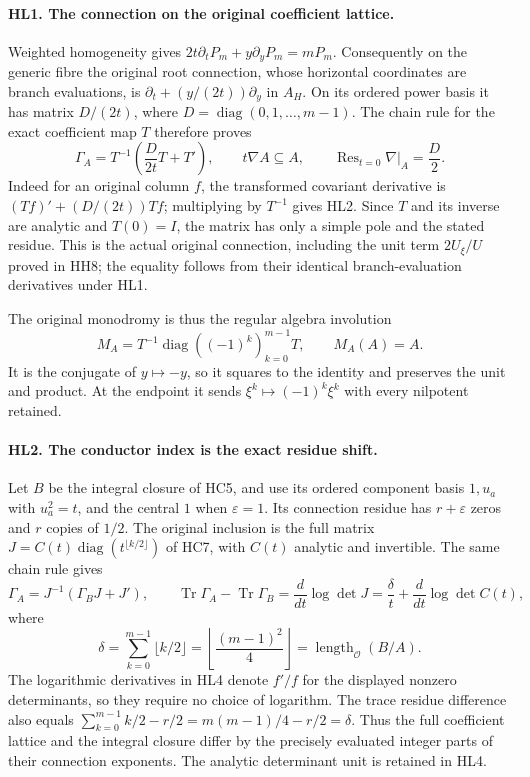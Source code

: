 \documentclass[11pt,a4paper]{article}
\theoremstyle{definition}\newtheorem{definition}[theorem]{Definition}
\begin{document}
\paragraph{HL1. The connection on the original coefficient lattice.}
Weighted homogeneity gives
$2t\partial_tP_m+y\partial_yP_m=mP_m$.
Consequently on the generic fibre the original root connection,
whose horizontal coordinates are branch evaluations, is
$\partial_t+(y/(2t))\partial_y$ in $A_H$.
On its ordered power basis it has matrix
$D/(2t)$, where $D=\operatorname{diag}(0,1,\ldots,m-1)$.
The chain rule for the exact coefficient map $T$ therefore proves
\[
 \Gamma_A=T^{-1}\left(\frac{D}{2t}T+T'\right),
 \qquad t\nabla A\subseteq A,
 \qquad \operatorname{Res}_{t=0}\nabla\big|_A=\frac D2.
 \tag{HL2}
\]
Indeed for an original column $f$, the transformed covariant
derivative is $(Tf)'+(D/(2t))Tf$; multiplying by $T^{-1}$ gives
HL2. Since $T$ and its inverse are analytic and $T(0)=I$, the
matrix has only a simple pole and the stated residue.
This is the actual original connection, including the unit term
$2U_\xi/U$ proved in HH8; the equality follows from their identical
branch-evaluation derivatives under HL1.

The original monodromy is thus the regular algebra involution
\[
 M_A=T^{-1}\operatorname{diag}((-1)^k)_{k=0}^{m-1}T,
       \qquad M_A(A)=A.
 \tag{HL3}
\]
It is the conjugate of $y\mapsto-y$, so it squares to the identity
and preserves the unit and product. At the endpoint it sends
$\xi^k\mapsto(-1)^k\xi^k$ with every nilpotent retained.

\paragraph{HL2. The conductor index is the exact residue shift.}
Let $B$ be the integral closure of HC5, and use its ordered
component basis $1,u_a$ with $u_a^2=t$, and the central $1$ when
$\varepsilon=1$. Its connection residue has $r+\varepsilon$
zeros and $r$ copies of $1/2$. The original inclusion is the full
matrix $J=C(t)\operatorname{diag}(t^{\lfloor k/2\rfloor})$ of HC7,
with $C(t)$ analytic and invertible. The same chain rule gives
\[
 \Gamma_A=J^{-1}(\Gamma_BJ+J'),\qquad
 \operatorname{Tr}\Gamma_A-\operatorname{Tr}\Gamma_B
    =\frac d{dt}\log\det J
    =\frac{\delta}{t}+\frac d{dt}\log\det C(t),
 \tag{HL4}
\]
where
\[
 \delta=\sum_{k=0}^{m-1}\lfloor k/2\rfloor
   =\left\lfloor\frac{(m-1)^2}{4}\right\rfloor
   =\operatorname{length}_{\mathcal O}(B/A).
 \tag{HL5}
\]
The logarithmic derivatives in HL4 denote $f'/f$ for the displayed
nonzero determinants, so they require no choice of logarithm.
The trace residue difference also equals
$\sum_{k=0}^{m-1}k/2-r/2=m(m-1)/4-r/2=\delta$.
Thus the full coefficient lattice and the integral closure differ
by the precisely evaluated integer parts of their connection
exponents. The analytic determinant unit is retained in HL4.
\end{document}
